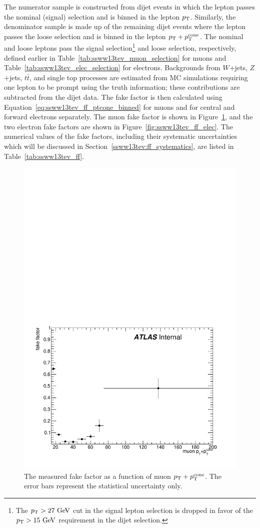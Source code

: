 The numerator sample is constructed from dijet events in which the lepton passes the nominal (signal) selection and is binned in the lepton $p_{\mathrm{T}}$.
Similarly, the denominator sample is made up of the remaining dijet events where the lepton passes the loose selection and is binned in the lepton $p_{\mathrm{T}}+p_{\mathrm{T}}^{\textrm{cone}}$.
The nominal and loose leptons pass the signal selection\footnote{The $\pt > 27\gev$ cut in the signal lepton selection is dropped in favor of the $\pt > 15\gev$ requirement in the dijet selection.} and loose selection, respectively, defined earlier in Table~\ref{tab:ssww13tev_muon_selection} for muons and Table~\ref{tab:ssww13tev_elec_selection} for electrons.
Backgrounds from $W$+jets, $Z$+jets, $t\bar{t}$, and single top processes are estimated from MC simulations requiring one lepton to be prompt using the truth information; these contributions are subtracted from the dijet data.
The fake factor is then calculated using Equation~\ref{eq:ssww13tev_ff_ptcone_binned} for muons and for central and forward electrons separately.
The muon fake factor is shown in Figure~\ref{fig:ssww13tev_ff_muon}, and the two electron fake factors are shown in Figure~\ref{fig:ssww13tev_ff_elec}.
The numerical values of the fake factors, including their systematic uncertainties which will be discussed in Section~\ref{ssww13tev:ff_systematics}, are listed in Table~\ref{tab:ssww13tev_ff}.

\begin{figure}[htbp]
  \centering
  \includegraphics[width=.6\textwidth]{figs/ssww_13tev/backgrounds/ff/muon_ff}
  \caption{The measured fake factor as a function of muon $p_{\mathrm{T}}+p_{\mathrm{T}}^{\textrm{cone}}$.  The error bars represent the statistical uncertainty only.}
  \label{fig:ssww13tev_ff_muon}
\end{figure}

